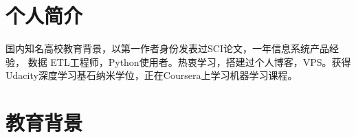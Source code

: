 \documentclass[11pt,a4paper]{moderncv}
\title{ }
\begin{document}
 
 \makecvtitle
 
  \section{个人简介}
  国内知名高校教育背景，以第一作者身份发表过SCI论文，一年信息系统产品经验， 数据 ETL工程师，Python使用者。热衷学习，搭建过个人博客，VPS。获得Udacity深度学习基石纳米学位，正在Coursera上学习机器学习课程。
  
 \section{教育背景}

   
\end{document}
